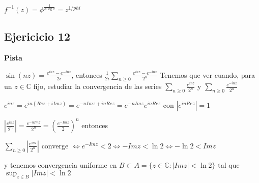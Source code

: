 $f^{-1}(z) = \phi^{\frac{1}{\phi\log z}} = z^{1/{phi}}$


\subsection{Ejericicio 12}
\textbf{Pista}

$\sin(nz) = \frac{e^{inz}-e^{-inz}}{2i}$, entonces
$\frac{1}{2i} \sum_{n\geq 0} \frac{e^{inz}-e^{-inz}}{2^n}$
Tenemos que ver cuando, para un $z\in\mathbb{C}$ fijo, estudiar la convergencia de las series
$\sum_{n\geq 0} \frac{e^{inz}}{2^n}$ y $\sum_{n\geq 0} \frac{e^{-inz}}{2^n}$

$e^{inz} = e^{in(Rez+iImz)} = e^{-nImz+inRez} = e^{-nImz}e^{inRez}$ con $|e^{inRez}|=1$

$|\frac{e^{inz}}{2^n}| = \frac{e^{-nImz}}{2^n} = (\frac{e^{-Imz}}{2})^n$
entonces

$\sum_{n\geq 0} |\frac{e^{inz}}{2^n}|$ converge $\Longleftrightarrow e^{-Imz} < 2 \Longleftrightarrow -Imz < \ln 2 \Longleftrightarrow -\ln 2 < Imz$

y tenemos convergencia uniforme en $B\subset A= \{ z\in\mathbb{C} : |Imz|<\ln 2 \}$ tal que $\sup_{z\in B} |Imz| < \ln 2$
